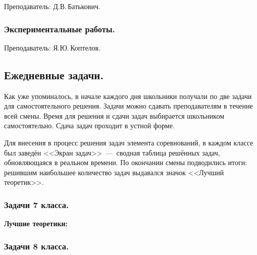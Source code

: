 \documentclass[12pt,a4paper,oneside]{scrartcl}
\newcounter{notask}
\newlength{\h}
\newlength{\x}
\begin{document}
\textsf{Преподаватель: Д.В.\,Батькович.}
\smallskip





\setcounter{notask}{1}
\parindent=5mm
\newpage
\subsubsection{Экспериментальные работы.}
\label{sec:daily_11_exp}

\textsf{Преподаватель: Я.Ю.\,Коптелов.}
\smallskip



\subsection{Ежедневные задачи.}
\label{sec:2-a-day}

Как уже упоминалось, в начале каждого дня школьники получали по две
задачи для самостоятельного решения. Задачи можно сдавать
преподавателям в течение всей смены. Время для решения и сдачи задач
выбирается школьником самостоятельно. Сдача задач проходит в устной
форме.

Для внесения в процесс решения задач элемента соревнований, в каждом
классе был заведён <<Экран задач>>~---~сводная таблица решённых задач,
обновляющаяся в реальном времени. По окончании смены подводились
итоги: решившим наибольшее количество задач выдавался значок <<Лучший
теоретик>>. 

\subsubsection{Задачи 7 класса.}
\label{sec:2-a-day_7}

\setcounter{notask}{1}
\vspace{1cm}

\begin{center}
\textbf{Лучшие теоретики:}
\end{center}

\begin{figure}[h]
  \centering
  \hspace{0.05\textwidth}
\end{figure}

\subsubsection{Задачи 8 класса.}
\label{sec:2-a-day_8}

\setcounter{notask}{1}
\vspace{1cm}
\end{document}
